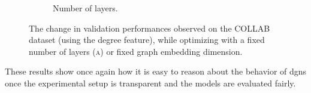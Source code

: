 \begin{figure}[h!]
\begin{subfigure}[b]{0.49\textwidth}
        \caption{Number of layers.}
        \label{fig:collab-degree-emb}
    \end{subfigure}
       \caption{The change in validation performances observed on the COLLAB dataset (using the degree feature), while optimizing with a fixed number of layers \textsc{(a)} or fixed graph embedding dimension.}
       \label{fig:collab-degree-posthoc}
\end{figure}

These results show once again how it is easy to reason about the behavior of \glspl{dgn} once the experimental setup is transparent and the models are evaluated fairly.